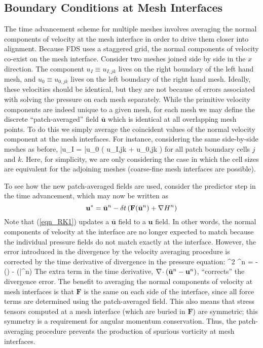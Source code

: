 \subsection{Boundary Conditions at Mesh Interfaces}
\label{section:mesh_interface}

The time advancement scheme for multiple meshes involves averaging the normal components of velocity at the mesh interface in
order to drive them closer into alignment. Because FDS uses a staggered grid, the normal components of velocity co-exist on the mesh interface.
Consider two meshes joined side by side in the $x$ direction. The component $u_I \equiv u_{I,jk}$ lives on the right boundary of the left hand mesh, and
$u_0 \equiv u_{0,jk}$ lives on the left boundary of the right hand mesh.
Ideally, these velocities should be identical, but they are not because of errors associated with solving the pressure on each mesh separately.
While the primitive velocity components are indeed unique to a given mesh, for each mesh we may define the
discrete ``patch-averaged'' field $\bar{\mathbf{u}}$ which is identical at all overlapping mesh points.
To do this we simply average the coincident values of the normal velocity component at the mesh interfaces.
For instance, considering the same side-by-side meshes as before,
\be
\label{eqn_patchave_ufield}
\bar{u}_I = \bar{u}_0 \equiv {} \left( u_{I,jk} + u_{0,jk} \right)
\ee
for all patch boundary cells $j$ and $k$. Here, for simplicity, we are only considering the case in which the
cell sizes are equivalent for the adjoining meshes (coarse-fine mesh interfaces are possible).

To see how the new patch-averaged fields are used, consider the predictor step in the time advancement,
which may now be written as
\begin{equation}
\label{eqn_RK1}
\mathbf{u}^* = \bar{\mathbf{u}}^n - \delta t \left( \mathbf{F}(\bar{\mathbf{u}}^n) + {\nabla H}^n \right)
\end{equation}
Note that (\ref{eqn_RK1}) updates a $\bar{\mathbf{u}}$ field to a $\mathbf{u}$ field. In other words, the normal components
of velocity at the interface are no longer expected to match because the individual pressure fields do not match exactly
at the interface. However, the error introduced in the divergence by the velocity averaging procedure is corrected by the time
derivative of divergence in the pressure equation:
\be
\label{eqn_poisson_stg1}
\nabla^2 {\cH}^n = -\left(\right) -
  (\bar{}^n)
\ee
The extra term in the time derivative, $\nabla\!\cdot (\bar{{\mathbf{u}}}^n - {\mathbf{u}}^n)$, ``corrects'' the divergence error.
The benefit to averaging the normal components of velocity at mesh interfaces is that $\mathbf{F}$ is the same on each side of the interface,
since all force terms are determined using the patch-averaged field.
This also means that stress tensors computed at a mesh interface (which are buried in $\mathbf{F}$) are symmetric;
this symmetry is a requirement for angular momentum conservation.  Thus, the patch-averaging procedure prevents the
production of spurious vorticity at mesh interfaces.

